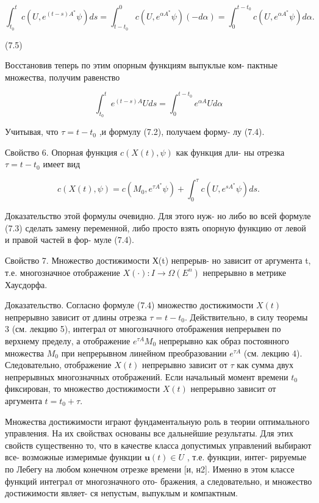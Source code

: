\documentclass[8pt]{extarticle}
\begin{document}
\[
{\int }_{{t}_{0}}^{t}c\left( {U,{e}^{\left( {t - s}\right) {A}^{ * }}\psi }\right) {ds} = {\int }_{t - {t}_{0}}^{0}c\left( {U,{e}^{\alpha {A}^{ * }}\psi }\right) \left( {-{d\alpha }}\right)  = {\int }_{0}^{t - {t}_{0}}c\left( {U,{e}^{\alpha {A}^{ * }}\psi }\right) {d\alpha }.
\]

(7.5)

Восстановив теперь по этим опорным функциям выпуклые ком- пактные множества, получим равенство

\[
{\int }_{{t}_{0}}^{t}{e}^{\left( {t - s}\right) A}{Uds} = {\int }_{0}^{t - {t}_{0}}{e}^{\alpha A}{Ud\alpha }
\]

Учитывая, что \(\tau  = t - {t}_{0}\) ,и формулу (7.2), получаем форму- лу (7.4).

Свойство 6. Опорная функция \(c\left( {X\left( t\right) ,\psi }\right)\) как функция дли- ны отрезка \(\tau  = t - {t}_{0}\) имеет вид

\[
c\left( {X\left( t\right) ,\psi }\right)  = c\left( {{M}_{0},{e}^{\tau {A}^{ * }}\psi }\right)  + {\int }_{0}^{\tau }c\left( {U,{e}^{s{A}^{ * }}\psi }\right) {ds}. \tag{7.6}
\]

Доказательство этой формулы очевидно. Для этого нуж- но либо во всей формуле (7.3) сделать замену переменной, либо просто взять опорную функцию от левой и правой частей в фор- муле (7.4).

Свойство 7. Множество достижимости Х(t) непрерыв- но зависит от аргумента t, т.е. многозначное отображение \(X\left( \cdot \right)  : I \rightarrow  \Omega \left( {E}^{n}\right)\) непрерывно в метрике Хаусдорфа.

Доказательство. Согласно формуле (7.4) множество достижимости \(X\left( t\right)\) непрерывно зависит от длины отрезка \(\tau = t - {t}_{0}\). Действительно, в силу теоремы 3 (см. лекцию 5), интеграл от многозначного отображения непрерывен по верхнему пределу, а отображение \({e}^{\tau A}M_{0}\) непрерывно как образ постоянного множества \(M_{0}\) при непрерывном линейном преобразовании \({e}^{\tau A}\) (см. лекцию 4). Следовательно, отображение \(X\left( t\right)\) непрерывно зависит от \(\tau\) как сумма двух непрерывных многозначных отображений. Если начальный момент времени \(t_{0}\) фиксирован, то множество достижимости \(X\left( t\right)\) непрерывно зависит от аргумента \(t = {t}_{0} + \tau\).

Множества достижимости играют фундаментальную роль в теории оптимального управления. На их свойствах основаны все дальнейшие результаты. Для этих свойств существенно то, что в качестве класса допустимых управлений выбирают все- возможные измеримые функции \(\mathbf{u}\left( t\right)  \in  U\) , т.е. функции, интег- рируемые по Лебегу на любом конечном отрезке времени [и, н2]. Именно в этом классе функций интеграл от многозначного ото- бражения, а следовательно, и множество достижимости являет- ся непустым, выпуклым и компактным.
\end{document}
